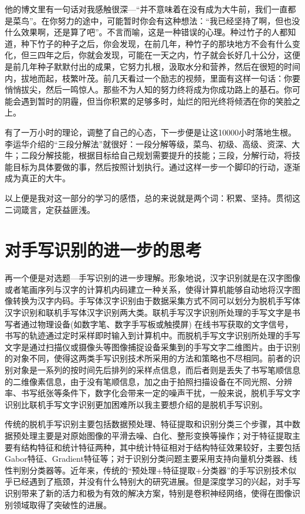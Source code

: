 \documentclass{article}
\begin{document}
他的博文里有一句话对我感触很深—“并不意味着在没有成为大牛前，我们一直都是菜鸟”。在你努力的途中，可能暂时你会有这种想法：“我已经坚持了啊，但也没什么效果啊，还是算了吧”。不言而喻，这是一种错误的心理。种过竹子的人都知道，种下竹子的种子之后，你会发现，在前几年，种竹子的那块地方不会有什么变化，但三四年之后，你就会发现，可能在一天之内，竹子就会长好几十公分，这便是前几年种子默默付出的成果，它努力扎根，汲取水分和营养，然后在很短的时间内，拔地而起，枝繁叶茂。前几天看过一个励志的视频，里面有这样一句话：你要悄悄拔尖，然后一鸣惊人。那些不为人知的努力终将成为你成功路上的基石。你可能会遇到暂时的阴霾，但当你积累的足够多时，灿烂的阳光终将倾洒在你的笑脸之上。


有了一万小时的理论，调整了自己的心态，下一步便是让这10000小时落地生根。李运华介绍的“三段分解法”就很好：一段分解等级，菜鸟、初级、高级、资深、大牛；二段分解技能，根据目标给自己规划需要提升的技能；三段，分解行动，将技能目标为具体要做的事，然后按照计划执行。通过这样一步一个脚印的行动，逐渐成为真正的大牛。

以上便是我对这一部分的学习的感悟，总的来说就是两个词：积累、坚持。贯彻这二词箴言，定获益匪浅。
\par
\section{对手写识别的进一步的思考}

再一个便是对选题—手写识别的进一步理解。形象地说，汉字识别\citep{huangyang,}就是在汉字图像或者笔画序列与汉字的计算机内码建立一种关系，使得计算机能够自动地将汉字图像转换为汉字内码。手写体汉字识别由于数据采集方式不同可以划分为脱机手写体汉字识别和联机手写体汉字识别两大类。联机手写汉字识别所处理的手写文字是书写者通过物理设备(如数字笔、数字手写板或触摸屏) 在线书写获取的文字信号，书写的轨迹通过定时采样即时输入到计算机中。而脱机手写文字识别所处理的手写文字是通过扫描仪或摄像头等图像捕捉设备采集到的手写文字二维图片。由于识别的对象不同，使得这两类手写识别技术所采用的方法和策略也不尽相同。前者的识别对象是一系列的按时间先后排列的采样点信息，而后者则是丢失了书写笔顺信息的二维像素信息，由于没有笔顺信息，加之由于拍照扫描设备在不同光照、分辨率、书写纸张等条件下，数字化会带来一定的噪声干扰，一般来说，脱机手写文字识别比联机手写文字识别更加困难所以我主要想介绍的是脱机手写识别。


传统的脱机手写识别主要包括数据预处理、特征提取和识别分类三个步骤，其中数据预处理主要是对原始图像的平滑去噪、白化、整形变换等操作；对于特征提取主要有结构特征和统计特征两种，其中统计特征相对于结构特征效果较好，主要包括Gabor特征、Gradient特征等；对于识别分类问题主要采用支持向量机分类器、线性判别分类器等。近年来，传统的“预处理+特征提取+分类器”的手写识别技术似乎已经遇到了瓶颈，并没有什么特别大的研究进展。但是深度学习的兴起，对手写识别带来了新的活力和极为有效的解决方案，特别是卷积神经网络，使得在图像识别领域取得了突破性的进展\citep{KumarA,}。
\end{document}
